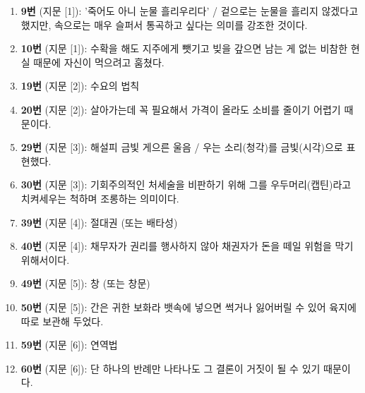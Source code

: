 \documentclass[10pt, a4paper]{article}
\begin{document}
\vspace{2mm}

\begin{enumerate}[label={}, leftmargin=0em, itemsep=2pt]
\item \textbf{9번} (지문 [1]): '죽어도 아니 눈물 흘리우리다' / 겉으로는 눈물을 흘리지 않겠다고 했지만, 속으로는 매우 슬퍼서 통곡하고 싶다는 의미를 강조한 것이다.
\item \textbf{10번} (지문 [1]): 수확을 해도 지주에게 뺏기고 빚을 갚으면 남는 게 없는 비참한 현실 때문에 자신이 먹으려고 훔쳤다.
\item \textbf{19번} (지문 [2]): 수요의 법칙
\item \textbf{20번} (지문 [2]): 살아가는데 꼭 필요해서 가격이 올라도 소비를 줄이기 어렵기 때문이다.
\item \textbf{29번} (지문 [3]): 해설피 금빛 게으른 울음 / 우는 소리(청각)를 금빛(시각)으로 표현했다.
\item \textbf{30번} (지문 [3]): 기회주의적인 처세술을 비판하기 위해 그를 우두머리(캡틴)라고 치켜세우는 척하며 조롱하는 의미이다.
\item \textbf{39번} (지문 [4]): 절대권 (또는 배타성)
\item \textbf{40번} (지문 [4]): 채무자가 권리를 행사하지 않아 채권자가 돈을 떼일 위험을 막기 위해서이다.
\item \textbf{49번} (지문 [5]): 창 (또는 창문)
\item \textbf{50번} (지문 [5]): 간은 귀한 보화라 뱃속에 넣으면 썩거나 잃어버릴 수 있어 육지에 따로 보관해 두었다.
\item \textbf{59번} (지문 [6]): 연역법
\item \textbf{60번} (지문 [6]): 단 하나의 반례만 나타나도 그 결론이 거짓이 될 수 있기 때문이다.
\end{enumerate}
\end{document}
